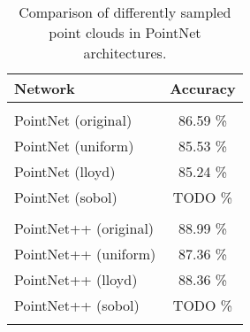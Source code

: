 \begin{table}[]
	\centering
	\begin{tabular}{lc}
		\hline
		\textbf{Network}      &\textbf{ Accuracy }\\ \hline
		                      &          \\
		PointNet (original)   & 86.59 \% \\
		PointNet (uniform)    & 85.53 \% \\
		PointNet (lloyd)      & 85.24 \% \\
		PointNet (sobol)      & TODO \%  \\
		                      &          \\
		PointNet++ (original) & 88.99 \% \\
		PointNet++ (uniform)  & 87.36 \% \\
		PointNet++ (lloyd)    & 88.36 \% \\
		PointNet++ (sobol)    & TODO \% \\
		                      &          \\ \hline
	\end{tabular}
\caption{Comparison of differently sampled point clouds in PointNet architectures.}
\label{Table:pn}
\end{table}